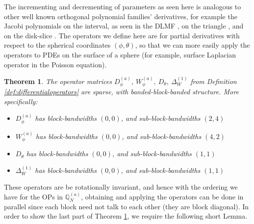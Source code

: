 \documentclass[11pt, oneside]{article}   	%
\newcommand{\bigscop}{{\mathbb{Q}}}
\newcommand{\bigscopa}{\bigscop^{(a)}}
\newcommand{\bigscopNa}{\bigscopa_{N}}
\newtheorem{theorem}{Theorem}
\begin{document}
The incrementing and decrementing of parameters as seen here is analogous to other well known orthogonal polynomial families' derivatives, for example the Jacobi polynomials on the interval, as seen in the DLMF \cite[(18.9.3)]{DLMF}, on the triangle \cite{olver2018recurrence}, and on the disk-slice \cite{snowball2019sparse}. The operators we define here are for partial derivatives with respect to the spherical coordinates $(\phi, \theta)$, so that we can more easily apply the operators to PDEs on the surface of a sphere (for example, surface Laplacian operator in the Poisson equation). 

\begin{theorem}\label{theorem:sparsityofdifferentialoperators}
The operator matrices $D_\phi^{(a)}, \: W_\phi^{(a)}, \: D_\theta, \: \Delta^{(1)}_W$ from Definition \ref{def:differentialoperators} are sparse, with banded-block-banded structure. More specifically:
\begin{itemize}
	\item $D_\phi^{(a)}$ has block-bandwidths $(0,0)$, and sub-block-bandwidths $(2, 4)$
  	\item $W_\phi^{(a)}$ has block-bandwidths $(0,0)$, and sub-block-bandwidths $(4, 2)$
	\item $D_\theta$ has  block-bandwidths $(0,0)$, and sub-block-bandwidths $(1, 1)$
	\item $\Delta^{(1)}_W$ has block-bandwidths $(0,0)$, and sub-block-bandwidths $(1, 1)$
\end{itemize}
\end{theorem}

These operators are be rotationally invariant, and hence with the ordering we have for the OPs in $\bigscopNa$, obtaining and applying the operators can be done in parallel since each block need not talk to each other (they are block diagonal). In order to show the last part of Theorem \ref{theorem:sparsityofdifferentialoperators}, we require the following short Lemma.
\end{document}
